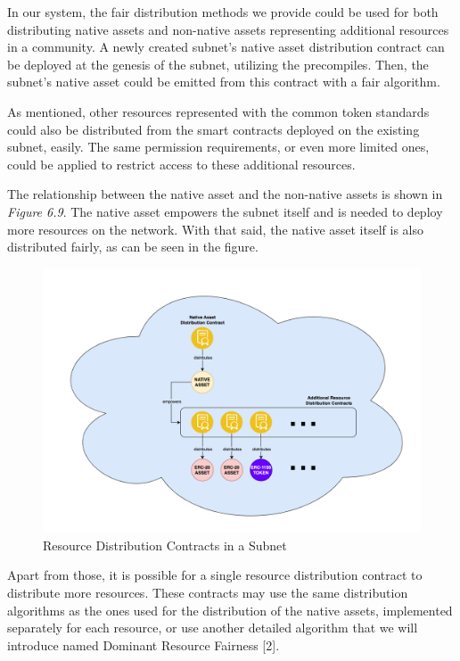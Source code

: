 \documentclass[a4paper,12pt]{report}
\begin{document}
In our system, the fair distribution methods we provide could be used for both distributing native assets and non-native assets representing additional resources in a community. 
\newpage
A newly created subnet’s native asset distribution contract can be deployed at the genesis of the subnet, utilizing the precompiles. Then, the subnet’s native asset could be emitted from this contract with a fair algorithm. 

As mentioned, other resources represented with the common token standards could also be distributed from the smart contracts deployed on the existing subnet, easily. The same permission requirements, or even more limited ones, could be applied to restrict access to these additional resources.

The relationship between the native asset and the non-native assets is shown in \textit{Figure 6.9}. The native asset empowers the subnet itself and is needed to deploy more resources on the network. With that said, the native asset itself is also distributed fairly, as can be seen in the figure.

\begin{figure}[H]
	\centering
	\includegraphics[width=1\textwidth]{subnet_2.png}
	\caption{Resource Distribution Contracts in a Subnet}
\end{figure}

Apart from those, it is possible for a single resource distribution contract to distribute more resources. These contracts may use the same distribution algorithms as the ones used for the distribution of the native assets, implemented separately for each resource, or use another detailed algorithm that we will introduce named Dominant Resource Fairness [2]. 
\end{document}

